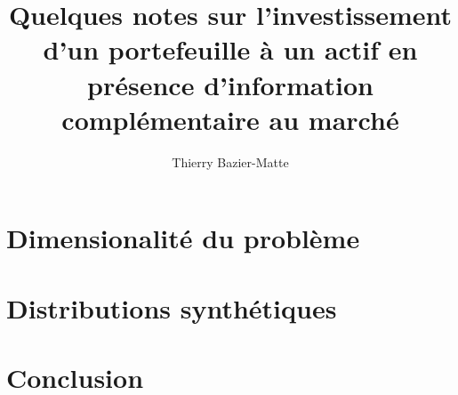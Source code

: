 \documentclass{article}
\title{Quelques notes sur l'investissement d'un portefeuille à un actif en présence
  d'information complémentaire au marché}
\author{Thierry Bazier-Matte}
\begin{document}
\maketitle
\tableofcontents

\newpage

\newpage

\newpage

\newpage

\section{Dimensionalité du problème}

\section{Distributions synthétiques}

\section{Conclusion}

\newpage
\end{document}

